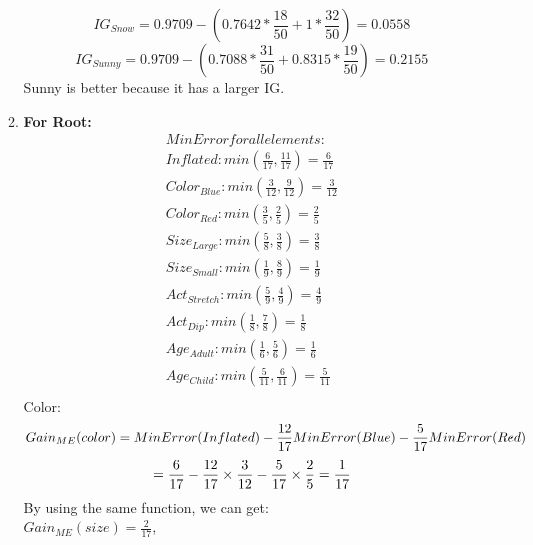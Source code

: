 \documentclass{article}
\begin{document}
\begin{enumerate}
\begin{enumerate}
            \begin{equation*}
                IG_{Snow} = 0.9709-(0.7642*\frac{18}{50}+1*\frac{32}{50})=0.0558
            \end{equation*}
            \begin{equation*}
                IG_{Sunny} = 0.9709-(0.7088*\frac{31}{50}+0.8315*\frac{19}{50})=0.2155
            \end{equation*}
            Sunny is better because it has a larger IG.

            \item %
            \textbf{For Root:} \\
	\begin{equation*}
	\begin{split}
	MinError for all elements:\\
	Inflated: min(\frac{6}{17}, \frac{11}{17}) = \frac{6}{17}\\
	Color_{Blue}: min(\frac{3}{12}, \frac{9}{12}) = \frac{3}{12}\\
	Color_{Red}: min(\frac{3}{5}, \frac{2}{5}) = \frac{2}{5}\\
	Size_{Large}: min(\frac{5}{8}, \frac{3}{8}) = \frac{3}{8}\\
	Size_{Small}: min(\frac{1}{9}, \frac{8}{9}) = \frac{1}{9}\\
	Act_{Stretch}: min(\frac{5}{9}, \frac{4}{9}) = \frac{4}{9}\\
	Act_{Dip}: min(\frac{1}{8}, \frac{7}{8}) = \frac{1}{8}\\
	Age_{Adult}: min(\frac{1}{6}, \frac{5}{6}) = \frac{1}{6}\\
	Age_{Child}: min(\frac{5}{11}, \frac{6}{11}) = \frac{5}{11}\\
	\end{split}
	\end{equation*}
            Color: 
            \begin{equation*}
            Gain_{ME}(color)=MinError(Inflated)-\frac{12}{17}MinError(Blue)-\frac{5}{17}MinError(Red)\\
             \end{equation*}
              \begin{equation*}
            =\frac{6}{17}-\frac{12}{17} \times \frac{3}{12}-\frac{5}{17} \times \frac{2}{5}\\
            =\frac{1}{17}
            \end{equation*}
            By using the same function, we can get:\\
            $Gain_{ME}(size)=\frac{2}{17}$, \\

\end{enumerate}
\end{enumerate}
\end{document}
